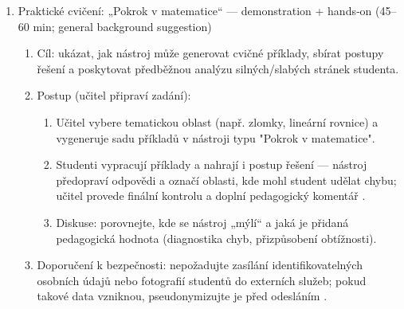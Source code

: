 \begin{enumerate}
  \item Praktické cvičení: „Pokrok v matematice“ — demonstration + hands‑on (45–60 min; general background suggestion)
    \begin{enumerate}
      \item Cíl: ukázat, jak nástroj může generovat cvičné příklady, sbírat postupy řešení a poskytovat předběžnou analýzu silných/slabých stránek studenta.
      \item Postup (učitel připraví zadání):
        \begin{enumerate}
          \item Učitel vybere tematickou oblast (např. zlomky, lineární rovnice) a vygeneruje sadu příkladů v nástroji typu "Pokrok v matematice".
          \item Studenti vypracují příklady a nahrají i postup řešení — nástroj předopraví odpovědi a označí oblasti, kde mohl student udělat chybu; učitel provede finální kontrolu a doplní pedagogický komentář \cite{kb_ai_101_tipu_pdf_04e4a115_page_8_1}.
          \item Diskuse: porovnejte, kde se nástroj „mýlí“ a jaká je přidaná pedagogická hodnota (diagnostika chyb, přizpůsobení obtížnosti).
        \end{enumerate}
      \item Doporučení k bezpečnosti: nepožadujte zasílání identifikovatelných osobních údajů nebo fotografií studentů do externích služeb; pokud takové data vzniknou, pseudonymizujte je před odesláním \cite{kb_malinka_chatgpt_ve_vyuce_dva_roky_pote_2024_pdf_90bc3aaf_page_12_1}.
    \end{enumerate}


\end{enumerate}
